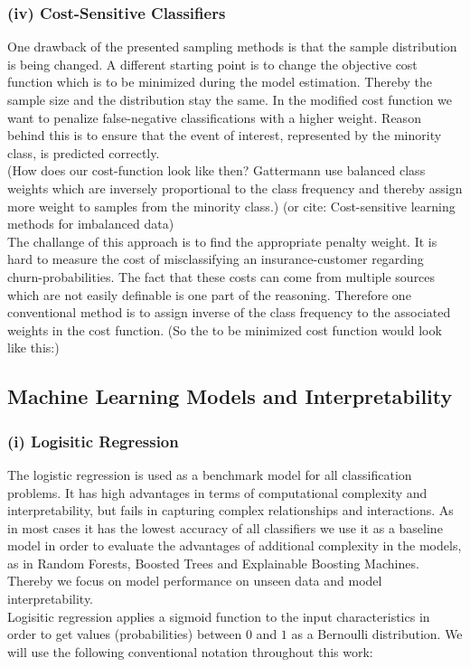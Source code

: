 \documentclass[12pt,titlepage]{article}
\begin{document}
\subsubsection*{(iv) Cost-Sensitive Classifiers} \label{Cost-Sensitive Classifiers}
One drawback of the presented sampling methods is that the sample distribution is being changed. A different starting point is to change the objective cost function which
is to be minimized during the model estimation. Thereby the sample size and the distribution stay the same. In the modified cost function we want to penalize false-negative
classifications with a higher weight. Reason behind this is to ensure that the event of interest, represented by the minority class, is predicted correctly. \\
(How does our cost-function look like then? Gattermann use balanced class weights which are inversely proportional to the class frequency and thereby assign more weight to samples
from the minority class.) (or cite: Cost-sensitive learning methods for imbalanced data)  \\
The challange of this approach is to find the appropriate penalty weight. It is hard to measure the cost of misclassifying an insurance-customer regarding churn-probabilities.
The fact that these costs can come from multiple sources which are not easily definable is one part of the reasoning. Therefore one conventional method is to assign inverse of the class frequency to the associated weights in the cost function. (So the to be minimized cost function would look like this:)\\

\subsection{Machine Learning Models and Interpretability} \par

\subsubsection*{(i) Logisitic Regression}
The logistic regression is used as a benchmark model for all classification problems. It has high advantages in terms of computational complexity and interpretability,
but fails in capturing complex relationships and interactions. As in most cases it has the lowest accuracy of all classifiers we use it as a baseline model in order to
evaluate the advantages of additional complexity in the models, as in Random Forests, Boosted Trees and Explainable Boosting Machines. Thereby we focus on model performance on unseen data and model interpretability.\\
Logisitic regression applies a sigmoid function to the input characteristics in order to get values (probabilities) between $0$ and $1$ as a Bernoulli distribution. We will use the following conventional notation throughout this work: \\
\end{document}
